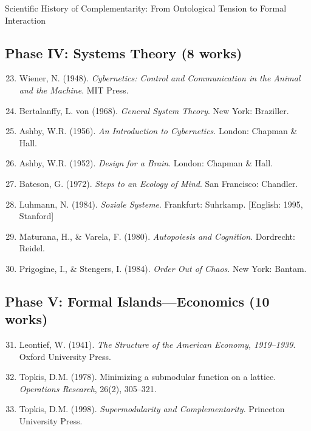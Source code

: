 \begin{chapter}{Scientific History of Complementarity: From Ontological Tension to Formal Interaction}
\subsection{Phase IV: Systems Theory (8 works)}

\begin{enumerate}
    \setcounter{enumi}{22}
    \item Wiener, N. (1948). \textit{Cybernetics: Control and Communication in the Animal and the Machine}. MIT Press.

    \item Bertalanffy, L. von (1968). \textit{General System Theory}. New York: Braziller.

    \item Ashby, W.R. (1956). \textit{An Introduction to Cybernetics}. London: Chapman \& Hall.

    \item Ashby, W.R. (1952). \textit{Design for a Brain}. London: Chapman \& Hall.

    \item Bateson, G. (1972). \textit{Steps to an Ecology of Mind}. San Francisco: Chandler.

    \item Luhmann, N. (1984). \textit{Soziale Systeme}. Frankfurt: Suhrkamp. [English: 1995, Stanford]

    \item Maturana, H., \& Varela, F. (1980). \textit{Autopoiesis and Cognition}. Dordrecht: Reidel.

    \item Prigogine, I., \& Stengers, I. (1984). \textit{Order Out of Chaos}. New York: Bantam.
\end{enumerate}

\subsection{Phase V: Formal Islands---Economics (10 works)}

\begin{enumerate}
    \setcounter{enumi}{30}
    \item Leontief, W. (1941). \textit{The Structure of the American Economy, 1919--1939}. Oxford University Press.

    \item Topkis, D.M. (1978). Minimizing a submodular function on a lattice. \textit{Operations Research}, 26(2), 305--321.

    \item Topkis, D.M. (1998). \textit{Supermodularity and Complementarity}. Princeton University Press.


\end{enumerate}
\end{chapter}
